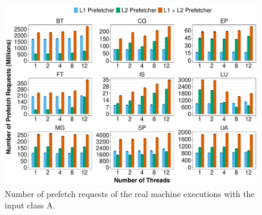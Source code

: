 \documentclass[AMA,final,STIX1COL]{WileyNJD-v2}
\newcommand{\vsg}[1]{\textcolor{blue}{\bfseries \ul{vsgirelli: #1} }\vspace{0.2cm}}
\newcommand{\fbm}[1]{\textcolor{red}{\bfseries \ul{fbm: #1} }\vspace{0.2cm}}
\begin{document}
\begin{figure}[!htb]
    \centering
    \includegraphics[width=\linewidth]{figures/fig3.pdf}
    \caption{Number of prefetch requests of the real machine executions with the input class A.}
    \label{fig:real_l2-rqsts-all-pf}
\end{figure}




\end{document}
